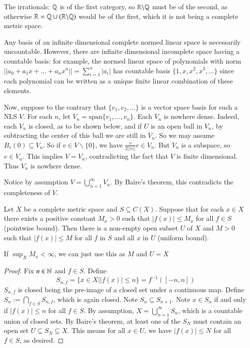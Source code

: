 \begin{example}
    The irrationals: $\mathbb Q$ is of the first category, so $\mathbb R\backslash \mathbb Q$ must be of the second, as otherwise $\mathbb R = \mathbb Q\cup (\mathbb R\backslash \mathbb Q)$ would be of the first, which it is not being a complete metric space.
\end{example}

\begin{example}
    Any basis of an infinite dimensional complete normed linear space is necessarily uncountable. However, there are infinite dimensional incomplete space having a countable basis: for example, the normed linear space of polynomials with norm $||a_0+a_1x+...+a_nx^n|| = \sum_{i=1}^n|a_i|$ has countable basis $\{1,x,x^2,x^3,...\}$ since each polynomial can be written as a unique finite linear combination of these elements.

    Now, suppose to the contrary that $\{v_1,v_2,...\}$ is a vector space basis for such a NLS $V$. For each $n$, let $V_n = \text{span}\{v_1,...,v_n\}$. Each $V_n$ is nowhere dense. Indeed, each $V_n$ is closed, as to be shown below, and if $U$ is an open ball in $V_n$, by subtracting the center of this ball we are still in $V_n$. So we may assume $B_r(0) \subseteq V_n$. So if $v \in V\backslash \{0\}$, we have $\frac{v}{2||v||}r \in V_n$. But $V_n$ is a subspace, so $v \in V_n$. This implies $V = V_n$, contradicting the fact that $V$ is finite dimensional. Thus $V_n$ is nowhere dense. 

    Notice by assumption $V = \bigcup_{n=1}^{\infty}V_n$. By Baire's theorem, this contradicts the completeness of $V$.
\end{example}

\begin{theorem}
    Let $X$ be a complete metric space and $S \subseteq C(X)$. Suppose that for each $x \in X$ there exists a positive constant $M_x > 0$ such that $|f(x)| \leq M_x$ for all $f \in S$ (pointwise bound). Then there is a non-empty open subset $U$ of $X$ and $M > 0$ such that $|f(x)| \leq M$ for all $f$ in $S$ and all $x$ in $U$ (uniform bound).
\end{theorem}
If $\sup_XM_x < \infty$, we can just use this as $M$ and $U = X$
\begin{proof}
    Fix $n \in \mathbb N$ and $f \in S$. Define $$S_{n,f} = \{x \in X\vert |f(x)| \leq n\} = f^{-1}([-n,n])$$ $S_{n,f}$ is closed being the pre-image of a closed set under a continuous map. Define $S_n := \bigcap_{f \in S}S_{n,f}$, which is again closed. Note $S_n \subseteq S_{n+1}$. Note $x \in S_n$ if and only if $|f(x)| \leq n$ for all $f \in S$. By assumption, $X = \bigcup_{n=1}^{\infty}S_n$, which is a countable union of closed sets. By Baire's theorem, at least one of the $S_N$ must contain an open set $U \subseteq S_N \subseteq X$. This means for all $x \in U$, we have $|f(x)| \leq N$ for all $f \in S$, as desired.
\end{proof}

